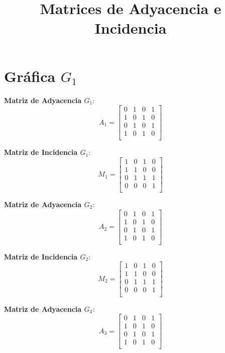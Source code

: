 \documentclass{article}
\begin{document}
\title{Matrices de Adyacencia e Incidencia}
\maketitle

\section*{Gráfica \( G_1 \)}

\textbf{Matriz de Adyacencia \( G_1 \)}:
\[
A_1 = 
\begin{bmatrix}
0 & 1 & 0 & 1 \\
1 & 0 & 1 & 0 \\
0 & 1 & 0 & 1 \\
1 & 0 & 1 & 0 \\
\end{bmatrix}
\]

\textbf{Matriz de Incidencia \( G_1 \)}:
\[
M_1 = 
\begin{bmatrix}
1 & 0 & 1 & 0 \\
1 & 1 & 0 & 0 \\
0 & 1 & 1 & 1 \\
0 & 0 & 0 & 1 \\
\end{bmatrix}
\]


\textbf{Matriz de Adyacencia \( G_2 \)}:
\[
A_2 = 
\begin{bmatrix}
0 & 1 & 0 & 1 \\
1 & 0 & 1 & 0 \\
0 & 1 & 0 & 1 \\
1 & 0 & 1 & 0 \\
\end{bmatrix}
\]

\textbf{Matriz de Incidencia \( G_2 \)}:
\[
M_2 = 
\begin{bmatrix}
1 & 0 & 1 & 0 \\
1 & 1 & 0 & 0 \\
0 & 1 & 1 & 1 \\
0 & 0 & 0 & 1 \\
\end{bmatrix}
\]

\textbf{Matriz de Adyacencia \( G_3 \)}:
\[
A_3 = 
\begin{bmatrix}
0 & 1 & 0 & 1 \\
1 & 0 & 1 & 0 \\
0 & 1 & 0 & 1 \\
1 & 0 & 1 & 0 \\
\end{bmatrix}
\]
\end{document}
